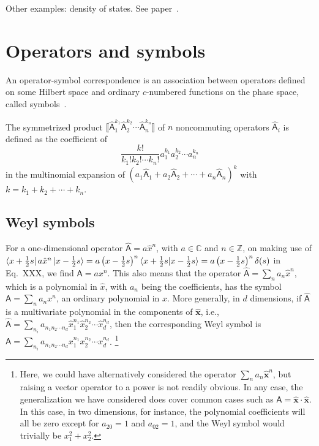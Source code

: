 Other examples: density of states.  See paper~\cite{gillespie1983}.

\section{Operators and symbols}

An operator-symbol correspondence is an association between operators defined on some Hilbert space and ordinary $c$-numbered functions on the phase space, called symbols~\cite[\S 2.3.1]{chaichian2001}.

The symmetrized product $\big\llbracket \hat{\mathsf{A}}_{1}^{k_{1}} \hat{\mathsf{A}}_{2}^{k_{2}} \cdots \hat{\mathsf{A}}_{n}^{k_n} \big\rrbracket$ of $n$ noncommuting operators $\hat{\mathsf{A}}_{i}$ is defined as the coefficient of
%
\begin{equation}
  \frac{k!}{k_{1}!k_{2}!\cdots k_{n}!} a_{1}^{k_{1}} a_{2}^{k_{2}} \cdots a_{n}^{k_{n}}
\end{equation}
%
in the multinomial expansion of $\left(a_{1}\hat{\mathsf{A}}_{1} + a_{2}\hat{\mathsf{A}}_{2} + \cdots + a_{n}\hat{\mathsf{A}}_{n}\right)^{k}$ with $k = k_{1} + k_{2} + \cdots + k_{n}$.

\subsection{Weyl symbols}

\begin{example}
  For a one-dimensional operator $\hat{\mathsf{A}} = a\hat{x}^{n}$, with $a \in \mathbb{C}$ and $n \in \mathbb{Z}$, on making use of $\mathinner{\langle{x + \frac{1}{2}s}\rvert}a\hat{x}^{n}\mathinner{\lvert{x - \frac{1}{2}s}\rangle} = a \left(x - \frac{1}{2}s\right)^{n}\mathinner{\langle{x + \frac{1}{2}s | x - \frac{1}{2}s}\rangle} = a\left(x - \frac{1}{2}s\right)^{n} \delta(s)$ in Eq.~XXX, we find $\mathsf{A} = a x^{n}$.
  This also means that the operator $\hat{\mathsf{A}} = \sum_{n} a_{n}\hat{x}^{n}$, which is a polynomial in $\hat{x}$, with $a_{n}$ being the coefficients, has the symbol
  $\mathsf{A} = \sum_{n} a_{n}{x}^{n}$, an ordinary polynomial in $x$.
  More generally, in $d$ dimensions, if $\hat{\mathsf{A}}$ is a multivariate polynomial in the components of $\hat{\bm{x}}$, i.e., $\hat{\mathsf{A}} = \sum_{n_{i}} a_{n_{1}n_{2}\cdots n_{d}} \hat{x}_{1}^{n_{1}}\hat{x}_{2}^{n_{2}}\cdots \hat{x}_{d}^{n_{d}}$, then the corresponding Weyl symbol is $\mathsf{A} = \sum_{n_{i}} a_{n_{1}n_{2}\cdots n_{d}} {x}_{1}^{n_{1}}{x}_{2}^{n_{2}}\cdots {x}_{d}^{n_{d}}$.%
  \footnote{Here, we could have alternatively considered the operator $\sum_{n} a_{n} \hat{\bm{x}}^{n}$, but raising a vector operator to a power is not readily obvious.
    In any case, the generalization we have considered does cover common cases such as $\hat{\mathsf{A}} = \hat{\bm{x}}\cdot\hat{\bm{x}}$.
  In this case, in two dimensions, for instance, the polynomial coefficients will all be zero except for $a_{20} = 1$ and $a_{02} = 1$, and the Weyl symbol would trivially be $x_{1}^{2} + x_{2}^{2}$.}
\end{example}

